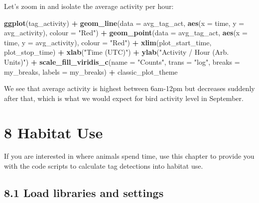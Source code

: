 \documentclass[
]{book}
\newenvironment{Shaded}{\begin{snugshade}}{\end{snugshade}}
\newcommand{\AttributeTok}[1]{\textcolor[rgb]{0.13,0.29,0.53}{#1}}
\newcommand{\FunctionTok}[1]{\textcolor[rgb]{0.13,0.29,0.53}{\textbf{#1}}}
\newcommand{\NormalTok}[1]{#1}
\newcommand{\SpecialCharTok}[1]{\textcolor[rgb]{0.81,0.36,0.00}{\textbf{#1}}}
\newcommand{\StringTok}[1]{\textcolor[rgb]{0.31,0.60,0.02}{#1}}
\begin{document}
Let's zoom in and isolate the average activity per hour:

\begin{Shaded}
\begin{Highlighting}[]
\FunctionTok{ggplot}\NormalTok{(tag\_activity) }\SpecialCharTok{+}
  \FunctionTok{geom\_line}\NormalTok{(}\AttributeTok{data =}\NormalTok{ avg\_tag\_act, }
            \FunctionTok{aes}\NormalTok{(}\AttributeTok{x =}\NormalTok{ time, }
                \AttributeTok{y =}\NormalTok{ avg\_activity),}
            \AttributeTok{colour =} \StringTok{"Red"}\NormalTok{) }\SpecialCharTok{+}
  \FunctionTok{geom\_point}\NormalTok{(}\AttributeTok{data =}\NormalTok{ avg\_tag\_act, }
             \FunctionTok{aes}\NormalTok{(}\AttributeTok{x =}\NormalTok{ time, }
                 \AttributeTok{y =}\NormalTok{ avg\_activity), }
             \AttributeTok{colour =} \StringTok{"Red"}\NormalTok{) }\SpecialCharTok{+}
  \FunctionTok{xlim}\NormalTok{(plot\_start\_time, plot\_stop\_time) }\SpecialCharTok{+}
  \FunctionTok{xlab}\NormalTok{(}\StringTok{"Time (UTC)"}\NormalTok{) }\SpecialCharTok{+}
  \FunctionTok{ylab}\NormalTok{(}\StringTok{"Activity / Hour (Arb. Units)"}\NormalTok{) }\SpecialCharTok{+}
  \FunctionTok{scale\_fill\_viridis\_c}\NormalTok{(}\AttributeTok{name =} \StringTok{"Counts"}\NormalTok{, }
                       \AttributeTok{trans =} \StringTok{"log"}\NormalTok{, }
                       \AttributeTok{breaks =}\NormalTok{ my\_breaks, }
                       \AttributeTok{labels =}\NormalTok{ my\_breaks) }\SpecialCharTok{+}
\NormalTok{  classic\_plot\_theme}
\end{Highlighting}
\end{Shaded}

We see that average activity is highest between 6am-12pm but decreases suddenly after that, which is what we would expect for bird activity level in September.

\chapter{8 Habitat Use}\label{habitat-use}

If you are interested in where animals spend time, use this chapter to provide you with the code scripts to calculate tag detections into habitat use.

\section{8.1 Load libraries and settings}\label{load-libraries-and-settings}
\end{document}
